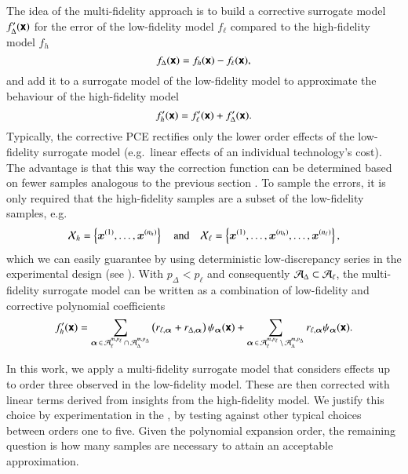 
The idea of the multi-fidelity approach is to build a corrective surrogate model $f_\Delta'(\boldsymbol{\mathsf{x}})$ for the
error of the low-fidelity model $f_\ell$ compared to the high-fidelity model $f_h$
\begin{equation}
    f_\Delta(\boldsymbol{\mathsf{x}}) = f_h(\boldsymbol{\mathsf{x}}) - f_\ell(\boldsymbol{\mathsf{x}}),
\end{equation}
and add it to a surrogate model of the low-fidelity model to approximate the behaviour of the
high-fidelity model
\begin{equation}
    f_h'(\boldsymbol{\mathsf{x}}) = f_\ell'(\boldsymbol{\mathsf{x}}) + f_\Delta'(\boldsymbol{\mathsf{x}}).
\end{equation}
Typically, the corrective PCE rectifies only the lower order effects of the
low-fidelity surrogate model (e.g.~linear effects of an individual technology's
cost).\cite{palar_multi-fidelity_2016} The advantage is that this way the
correction function can be determined based on fewer samples analogous to the
previous section . To sample the errors, it is only
required that the high-fidelity samples are a subset of the low-fidelity
samples, e.g.
\begin{equation}
    \mathcal{X}_h = \left\{ \bm{x}^{(1)}, \dots, \bm{x}^{(n_h)}\right\} \quad\text{and}\quad
    \mathcal{X}_\ell = \left\{ \bm{x}^{(1)}, \dots, \bm{x}^{(n_h)}, \dots, \bm{x}^{(n_\ell)}\right\},
\end{equation}
which we can easily guarantee by using deterministic low-discrepancy series
in the experimental design (see ).
With $p_\Delta < p_\ell$ and consequently $\mathcal{A}_\Delta \subset \mathcal{A}_\ell$,
the multi-fidelity surrogate model can be written as a combination of low-fidelity
and corrective polynomial coefficients
\begin{equation}
    f_h' (\boldsymbol{\mathsf{x}}) = \sum_{{\bm{\alpha}}\,\in\,\mathcal{A}_\ell^{m,p_\ell} \,\cap\, \mathcal{A}_\Delta^{m,p_\Delta}}
    \left(
     r_{\ell,{\bm{\alpha}}} + r_{\Delta,{\bm{\alpha}}}
    \right) \psi_{\bm{\alpha}}(\boldsymbol{\mathsf{x}}) +
    \sum_{{\bm{\alpha}}\,\in\,\mathcal{A}_\ell^{m,p_\ell} \,\setminus\, \mathcal{A}_\Delta^{m,p_\Delta}}
    r_{\ell,{\bm{\alpha}}} \psi_{\bm{\alpha}}(\boldsymbol{\mathsf{x}}).
\end{equation}


In this work, we apply a multi-fidelity surrogate model that considers
effects up to order three observed in the low-fidelity model. These are then corrected with linear terms derived from insights from the high-fidelity model.
We justify this choice by experimentation in the ,
by testing against other typical choices between orders one to five.\cite{gratiet_metamodel-based_2015}
Given the polynomial expansion order, the remaining question is how many samples are necessary to attain an acceptable approximation.

